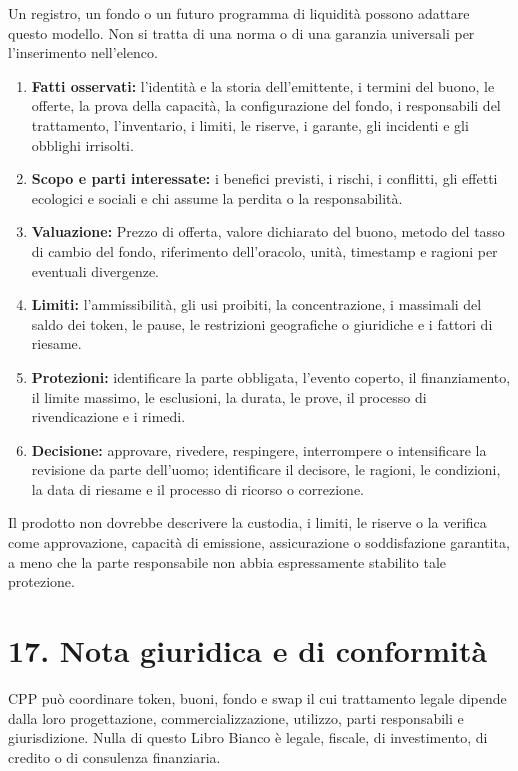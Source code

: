 \documentclass[11pt]{article}
\begin{document}
Un registro, un fondo o un futuro programma di liquidità possono adattare questo modello. Non si tratta di una norma o di una garanzia universali per l'inserimento nell'elenco.

\begin{enumerate}[leftmargin=*]
\item \textbf{Fatti osservati:} l'identità e la storia dell'emittente, i termini del buono, le offerte, la prova della capacità, la configurazione del fondo, i responsabili del trattamento, l'inventario, i limiti, le riserve, i garante, gli incidenti e gli obblighi irrisolti.
\item \textbf{Scopo e parti interessate:} i benefici previsti, i rischi, i conflitti, gli effetti ecologici e sociali e chi assume la perdita o la responsabilità.
\item \textbf{Valuazione:} Prezzo di offerta, valore dichiarato del buono, metodo del tasso di cambio del fondo, riferimento dell'oracolo, unità, timestamp e ragioni per eventuali divergenze.
\item \textbf{Limiti:} l'ammissibilità, gli usi proibiti, la concentrazione, i massimali del saldo dei token, le pause, le restrizioni geografiche o giuridiche e i fattori di riesame.
\item \textbf{Protezioni:} identificare la parte obbligata, l'evento coperto, il finanziamento, il limite massimo, le esclusioni, la durata, le prove, il processo di rivendicazione e i rimedi.
\item \textbf{Decisione:} approvare, rivedere, respingere, interrompere o intensificare la revisione da parte dell'uomo; identificare il decisore, le ragioni, le condizioni, la data di riesame e il processo di ricorso o correzione.
\end{enumerate}
Il prodotto non dovrebbe descrivere la custodia, i limiti, le riserve o la verifica come approvazione, capacità di emissione, assicurazione o soddisfazione garantita, a meno che la parte responsabile non abbia espressamente stabilito tale protezione.


\section*{17. Nota giuridica e di conformità}

CPP può coordinare token, buoni, fondo e swap il cui trattamento legale dipende dalla loro progettazione, commercializzazione, utilizzo, parti responsabili e giurisdizione. Nulla di questo Libro Bianco è legale, fiscale, di investimento, di credito o di consulenza finanziaria.
\end{document}
